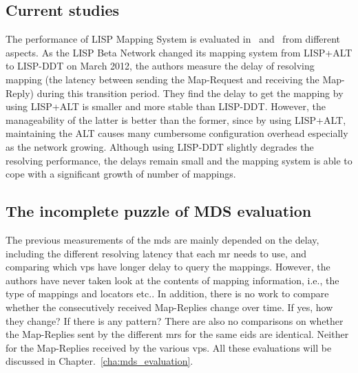 \subsection{Current studies}
\label{subsec:mds_studies}
The performance of LISP Mapping System is evaluated in~\cite{lispCCR} and~\cite{coras2014performance} from different aspects. As the LISP Beta Network changed its mapping system from LISP+ALT to LISP-DDT on March  2012, the authors measure the delay of resolving mapping (the latency between sending the Map-Request and receiving the Map-Reply) during this transition period. They find the delay to get the mapping by using LISP+ALT is smaller and more stable than LISP-DDT. However, the manageability of the latter is better than the former, since by using LISP+ALT, %
maintaining the ALT causes many cumbersome configuration overhead especially as the network growing. Although using LISP-DDT slightly degrades the resolving performance, the delays remain small and the mapping system is able to cope with a significant growth of number of mappings. %

\subsection{The incomplete puzzle of MDS evaluation}
\label{subsec:mds_missing}
The previous measurements of the \acrshort{mds} are mainly depended on the delay, including the different resolving latency that each \acrshort{mr} needs to use, and comparing which \acrshort{vp}s have longer delay to query the mappings. However, the authors have never taken look at the contents of mapping information, i.e., the type of mappings and locators etc.. In addition, there is no work to compare whether the consecutively received Map-Replies change over time. If yes, how they change? If there is any pattern? There are also no comparisons on whether the Map-Replies sent by the different \acrshort{mr}s for the same \acrshort{eid}s are identical. Neither for the Map-Replies received by the various \acrshort{vp}s. All these evaluations will be discussed in Chapter.~\ref{cha:mds_evaluation}.


